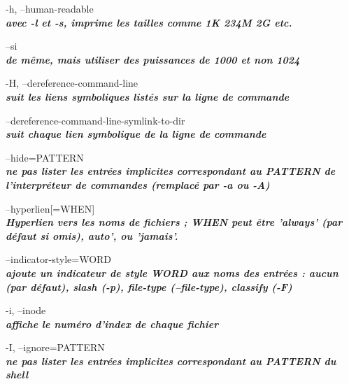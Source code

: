 \documentclass{article}
\begin{document}
       \par-h, --human-readable\\
               \textit{\textbf{avec -l et -s, imprime les tailles comme 1K 234M 2G etc.}}\\

       \par--si \\
		 \textit{\textbf{de même, mais utiliser des puissances de 1000 et non 1024}}\\

        \par-H, --dereference-command-line\\
              \textit{\textbf{suit les liens symboliques listés sur la ligne de commande}}\\

      \par --dereference-command-line-symlink-to-dir\\
              \textit{\textbf{suit chaque lien symbolique de la ligne de commande}}\\

              
       \par--hide=PATTERN\\
              \textit{\textbf{ne pas lister les entrées implicites correspondant au PATTERN de l'interpréteur de commandes (remplacé
              par -a ou -A)}}\\
\par--hyperlien[=WHEN]\\
              \textit{\textbf{Hyperlien vers les noms de fichiers ; WHEN peut être 'always' (par défaut si omis),
              auto', ou 'jamais'.}}\\

       \par--indicator-style=WORD\\
               \textit{\textbf{ajoute un indicateur de style WORD aux noms des entrées : aucun (par défaut),
              slash (-p), file-type (--file-type), classify (-F)}}\\
   
       \par -i, --inode\\
              \textit{\textbf{ affiche le numéro d'index de chaque fichier}}\\

        \par-I, --ignore=PATTERN\\
               \textit{\textbf{ne pas lister les entrées implicites correspondant au PATTERN du shell}}\\
\end{document}
